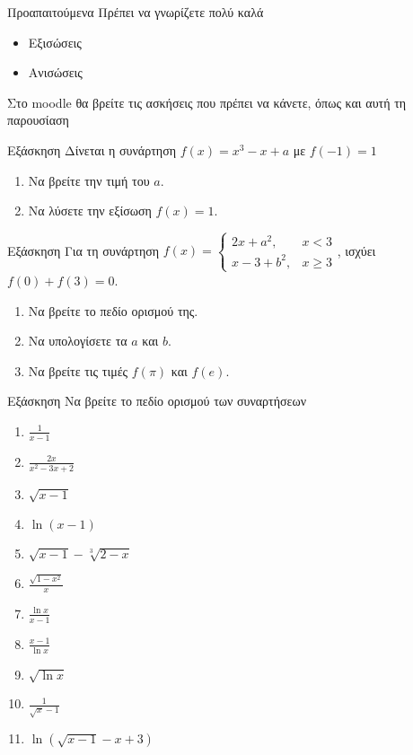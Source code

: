 \documentclass[greek]{beamer}
\begin{document}
\begin{frame}{Προαπαιτούμενα}
 Πρέπει να γνωρίζετε πολύ καλά
 \begin{itemize}
  \item Εξισώσεις
  \item Ανισώσεις
 \end{itemize}
\end{frame}

\begin{frame}
 Στο moodle θα βρείτε τις ασκήσεις που πρέπει να κάνετε, όπως και αυτή τη παρουσίαση
\end{frame}

\begin{frame}{Εξάσκηση}
 Δίνεται η συνάρτηση $f(x)=x^3-x+a$ με $f(-1)=1$
 \begin{enumerate}
  \item<1-> Να βρείτε την τιμή του $a$.
  \item<2-> Να λύσετε την εξίσωση $f(x)=1$.
 \end{enumerate}
\end{frame}

\begin{frame}{Εξάσκηση}
 Για τη συνάρτηση $f(x)=\begin{cases}
   2x+a^2,  & x<3  \\
   x-3+b^2, & x\ge3
  \end{cases}$, ισχύει $f(0)+f(3)=0$.
 \begin{enumerate}
  \item<1-> Να βρείτε το πεδίο ορισμού της.
  \item<2-> Να υπολογίσετε τα $a$ και $b$.
  \item<3-> Να βρείτε τις τιμές $f(\pi)$ και $f(e)$.
 \end{enumerate}
\end{frame}

\begin{frame}{Εξάσκηση}
 Να βρείτε το πεδίο ορισμού των συναρτήσεων
 \begin{enumerate}
  \item<1-> $\frac{1}{x-1}$
  \item<2-> $\frac{2x}{x^2-3x+2}$
  \item<3-> $\sqrt{x-1}$
  \item<4-> $\ln (x-1)$
  \item<5-> $\sqrt{x-1}-\sqrt[3]{2-x}$
  \item<6-> $\frac{\sqrt{1-x^2}}{x}$
  \item<7-> $\frac{\ln x}{x-1}$
  \item<8-> $\frac{x-1}{\ln x}$
  \item<9-> $\sqrt{\ln x}$
  \item<10-> $\frac{1}{\sqrt{x}-1}$
  \item<11-> $\ln \left(\sqrt{x-1}-x+3\right)$
 \end{enumerate}
\end{frame}
\end{document}
